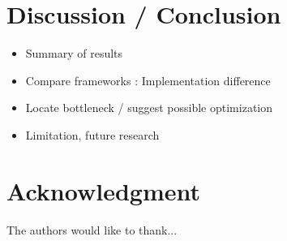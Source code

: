 \documentclass[conference]{IEEEtran}
\begin{document}
\section{Discussion / Conclusion}

\begin{itemize}
  \item Summary of results
  \item Compare frameworks : Implementation difference
  \item Locate bottleneck / suggest possible optimization
  \item Limitation, future research
\end{itemize}

\section*{Acknowledgment}

The authors would like to thank...

\end{document}
